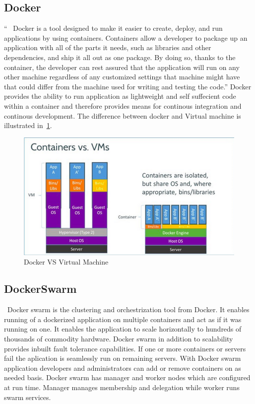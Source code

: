 \subsection{Docker}

``~\cite{hid-sp18-413-docker} Docker is a tool
designed to make it easier to create, deploy, and run applications by
using containers. Containers allow a developer to package up an
application with all of the parts it needs, such as libraries and
other dependencies, and ship it all out as one package. By doing so,
thanks to the container, the developer can rest assured that the
application will run on any other machine regardless of any customized
settings that machine might have that could differ from the machine
used for writing and testing the code.'' Docker provides the ability to
run application as lightweight and self suffecient code within a
container and therefore provides means for continous integration and
continous development. The difference between docker and Virtual
machine is illustrated in~\ref{f:contvsvm}.

\begin{figure}[!ht]
	\centering\includegraphics[width=\columnwidth]{images/dockervsvm.png}
	 \caption{Docker VS Virtual Machine}\label{f:contvsvm}
\end{figure}

\subsection{DockerSwarm}
~\cite{hid-sp18-413-dockerswarm}Docker swarm is the clustering and orchestrization tool from
Docker. It enables running of a dockerized application on multiple
containers and act as if it was running on one. It enables the
application to scale horizontally to hundreds of thousands of
commodity hardware. Docker swarm in addition to scalability provides
inbuilt fault tolerance capabilities. If one or more containers or
servers fail the aplication is seamlessly run on remaining
servers. With Docker swarm application developers and administrators
can add or remove containers on as needed basis. Docker swarm has
manager and worker nodes which are configured at run time. Manager
manages membership and delegation while worker runs swarm services.

